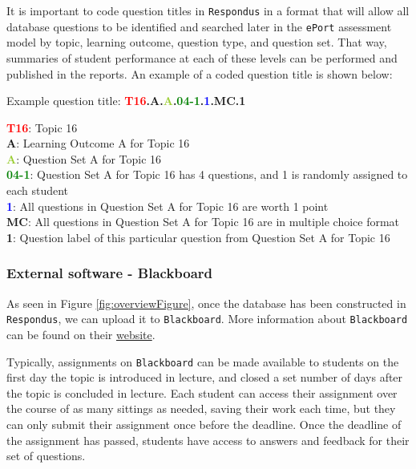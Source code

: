 \documentclass{article}\usepackage[]{graphicx}\usepackage[]{color}
\numberwithin{equation}{section} %
\begin{document}
It is important to code question titles in \texttt{Respondus} in a format that will allow all database questions to be identified and searched later in the \texttt{ePort} assessment model by topic, learning outcome, question type, and question set. That way, summaries of student performance at each of these levels can be performed and published in the reports. An example of a coded question title is shown below:

\begin{framed}
Example question title: \textbf{\textcolor{Red}{T16}.\textcolor{YellowOrange}{A}.\textcolor{YellowGreen}{A}.\textcolor{Green}{04-1}.\textcolor{blue}{1}.\textcolor{RedViolet}{MC}.\textcolor{VioletRed}{1}}

\textbf{\textcolor{Red}{T16}}: Topic 16\\
\textbf{\textcolor{YellowOrange}{A}}: Learning Outcome A for Topic 16\\
\textbf{\textcolor{YellowGreen}{A}}: Question Set A for Topic 16\\
\textbf{\textcolor{Green}{04-1}}: Question Set A for Topic 16 has 4 questions, and 1 is randomly assigned to each student\\
\textbf{\textcolor{blue}{1}}: All questions in Question Set A for Topic 16 are worth 1 point\\
\textbf{\textcolor{RedViolet}{MC}}: All questions in Question Set A for Topic 16 are in multiple choice format\\
\textbf{\textcolor{VioletRed}{1}}: Question label of this particular question from Question Set A for Topic 16\\
\vspace{-3mm}
\end{framed}

\subsubsection{External software - Blackboard}

As seen in Figure \ref{fig:overviewFigure}, once the database has been constructed in \texttt{Respondus}, we can upload it to \texttt{Blackboard}. More information about \texttt{Blackboard} can be found on their \href{http://www.blackboard.com/}{website}.

Typically, assignments on \texttt{Blackboard} can be made available to students on the first day the topic is introduced in lecture, and closed a set number of days after the topic is concluded in lecture. Each student can access their assignment over the course of as many sittings as needed, saving their work each time, but they can only submit their assignment once before the deadline. Once the deadline of the assignment has passed, students have access to answers and feedback for their set of questions. 
\end{document}
